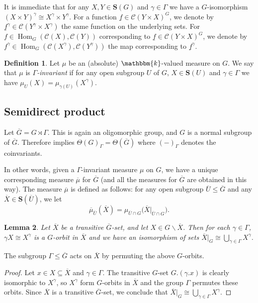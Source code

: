 \documentclass[11pt,a4paper]{amsart}
\theoremstyle{plain}%
\newtheorem{lemma}{Lemma}[subsection]
\theoremstyle{definition}
\newtheorem{definition}[lemma]{Definition}
\theoremstyle{remark}
\newcommand{\Hom}{\operatorname{Hom}}
\newcommand{\kk}{\mathbbm{k}}
\newcommand{\cC}{\mathcal{C}}
\newcommand{\Set}[1]{\mathbf{S}(#1)}
\newcommand{\oG}{{\overline{G}}}
\newcommand{\oU}{{\overline{U}}}
\begin{document}
It is immediate that for any $X, Y\in \Set{G}$ and $\gamma\in \Gamma$ we have a $G$-isomorphism $(X\times Y)^\gamma\cong X^\gamma\times Y^\gamma$. For a function $\underline{f}\in \cC(Y\times X)^G$, we denote by $\underline{f}^{\gamma}\in \cC(Y^\gamma\times X^\gamma)$ the same function on the underlying sets. For $f\in \Hom_G(\cC(X), \cC(Y))$ corresponding to $ \underline{f}\in \cC(Y\times X)^G$, we denote by $f^\gamma\in \Hom_G(\cC(X^\gamma), \cC(Y^\gamma))$ the map corresponding to $\underline{f}^{\gamma}$.

\begin{definition}
    Let $\mu$ be an (absolute) $\kk$-valued measure on $G$. We say that $\mu$ is \emph{$\Gamma$-invariant} if for any open subgroup $U$ of $G$, $X\in \Set{U}$ and $\gamma\in \Gamma$ we have $\mu_{U}(X) =\mu_{\gamma(U)}(X^\gamma)$.  
\end{definition}
\subsection{Semidirect product}
Let $\oG=G\rtimes \Gamma$. This is again an oligomorphic group, and $G$ is a normal subgroup of $\oG$. Therefore \cite[\S3.4(e)]{HS-oligomorphic} implies $\Theta(G)_{\Gamma} = \Theta(\oG)$ where $(-)_{\Gamma}$ denotes the coinvariants. 

In other words, given a $\Gamma$-invariant measure $\mu$ on $G$, we have a unique corresponding measure $\overline{\mu}$ for $\oG$ (and all the measures for $\oG$ are obtained in this way). The measure $\overline{\mu}$ is defined as follows: for any open subgroup $\overline{U}\leq \overline{G}$ and any $\overline{X}\in \Set{\oU}$, we let \[\label{eq:equivariantization-measure}
 \overline{\mu}_{\overline{U}}(\overline{X})=\mu_{\overline{U}\cap G}\bigl(\overline{X}|_{\overline{U}\cap G}\bigr).
\]

\begin{lemma}\label{lem:semidirect_restriction_on_sets}
    Let $\overline{X}$ be a transitive $\oG$-set, and let $X\in G\backslash  \overline{X}$. Then for each $\gamma\in \Gamma$, $\gamma X\cong X^{\gamma}$ is a $G$-orbit in $\overline{X}$ and we have an isomorphism of sets $\overline{X}|_G\cong \bigcup_{\gamma\in \Gamma} X^{\gamma}$.
\end{lemma}
 The subgroup $\Gamma \leq \oG$ acts on $\overline{X}$ by permuting the above $G$-orbits.
\begin{proof}
    Let $x\in X\subseteq \overline{X}$ and $\gamma\in \Gamma$. The transitive $G$-set $G.(\gamma.x)$ is clearly isomorphic to $X^\gamma$, so $X^{\gamma} $ form $G$-orbits in $\overline{X}$ and the group $\Gamma$ permutes these orbits. Since $\overline{X}$ is a transitive $\oG$-set, we conclude that $\overline{X}|_G\cong \bigcup_{\gamma\in \Gamma} X^{\gamma}$.
\end{proof}
\end{document}

